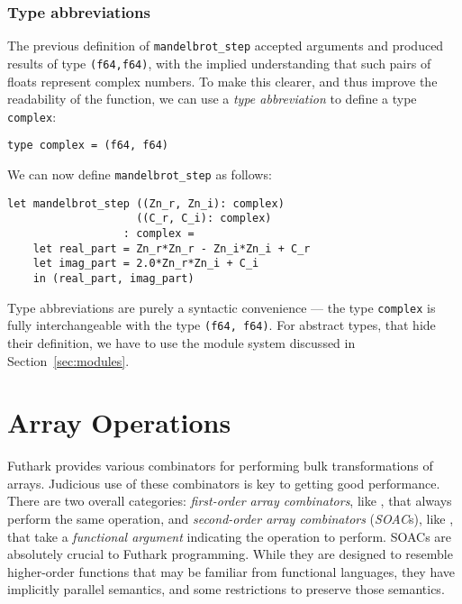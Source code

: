 \documentclass[oneside,11pt]{book}
\begin{document}
\subsubsection{Type abbreviations}
\label{sec:type-abbreviations}

The previous definition of \lstinline{mandelbrot_step} accepted
arguments and produced results of type \lstinline{(f64,f64)}, with the
implied understanding that such pairs of floats represent complex
numbers.  To make this clearer, and thus improve the readability of
the function, we can use a \textit{type abbreviation} to define a type
\lstinline{complex}:

\begin{lstlisting}
type complex = (f64, f64)
\end{lstlisting}

We can now define \lstinline{mandelbrot_step} as follows:

\begin{lstlisting}
let mandelbrot_step ((Zn_r, Zn_i): complex)
                    ((C_r, C_i): complex)
                  : complex =
    let real_part = Zn_r*Zn_r - Zn_i*Zn_i + C_r
    let imag_part = 2.0*Zn_r*Zn_i + C_i
    in (real_part, imag_part)
\end{lstlisting}

Type abbreviations are purely a syntactic convenience --- the type
\lstinline{complex} is fully interchangeable with the type
\lstinline{(f64, f64)}.  For abstract types, that hide their
definition, we have to use the module system discussed in
Section~\ref{sec:modules}.

\section{Array Operations}

Futhark provides various combinators for performing bulk
transformations of arrays.  Judicious use of these combinators is key
to getting good performance.  There are two overall categories:
\textit{first-order array combinators}, like , that
always perform the same operation, and \textit{second-order array
  combinators} (\textit{SOAC}s), like , that take a
\textit{functional argument} indicating the operation to perform.
SOACs are absolutely crucial to Futhark programming.  While they are
designed to resemble higher-order functions that may be familiar from
functional languages, they have implicitly parallel semantics, and
some restrictions to preserve those semantics.
\end{document}
